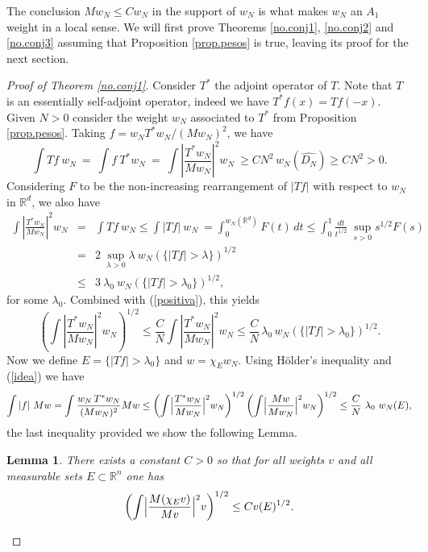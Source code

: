 \documentclass[11pt]{amsart}
\newtheorem{lemma}[teo]{Lemma}
\theoremstyle{definition}
\begin{document}
The conclusion $Mw_N\leq C w_N $ in the support of $ w_N$ is what makes  $ w_N$ an $A_1$ weight in a local sense. We will first prove Theorems \ref{no.conj1}, \ref{no.conj2} and \ref{no.conj3} assuming that Proposition \ref{prop.pesos} is true, leaving its proof for the next section.

\bigskip

\begin{proof}[Proof of Theorem \ref{no.conj1}] Consider $T^\ast$ the adjoint operator of $T$. Note that $T$ is an essentially self-adjoint operator, indeed we have $T^\ast f(x)= Tf(-x)$. Given $N>0$ consider the weight $w_N$ associated to $T^\ast$ from Proposition \ref{prop.pesos}. Taking $f=w_N T^\ast w_N/(Mw_N)^2$, we have
\begin{equation}\label{positiva}
\int Tf\ w_N\ =\ \int f\ T^\ast w_N\ =\ \int \left|\frac{T^\ast w_N}{Mw_N}\right|^2 w_N\ \geq CN^2\,w_N(\widehat{D_N})\geq CN^2> 0.
\end{equation}
Considering $F$ to be the non-increasing rearrangement of $|Tf|$ with respect to $w_N$ in ${\mathbb{R}}^d$, we also have
\begin{eqnarray}\label{lambda}
\int \left|\frac{T^\ast w_N}{Mw_N}\right|^2 w_N&=&\int Tf\ w_N \leq \int |Tf|\ w_N\ = \int_0^{w_N({\mathbb{R}}^d)} F(t)\,dt \leq \int_0^1 \frac{dt}{t^{1/2}}\  \sup_{s>0} s^{1/2} F(s) \nonumber\\&=& 2\ \sup_{\lambda>0} \lambda\ w_N(\{|Tf|>\lambda\})^{1/2} \nonumber\\&\leq& 3\ \lambda_0\ w_N(\{|Tf|>\lambda_0\})^{1/2},
\end{eqnarray}
for some $\lambda_0$. Combined with (\ref{positiva}), this yields 
\begin{equation}\label{idea}
\left(\int \left|\frac{T^\ast w_N}{Mw_N}\right|^2 w_N\right)^{1/2}\leq \frac CN \int \left|\frac{T^\ast w_N}{Mw_N}\right|^2 w_N \leq \frac CN\,\lambda_0\, w_N(\{|Tf|>\lambda_0\})^{1/2}.
\end{equation} 
Now we define $E=\{|Tf|>\lambda_0\}$ and $w=\chi_Ew_N$. Using H\"older's inequality and (\ref{idea}) we have
\[
\int |f|\ Mw = \int \frac{w_N\,T^\ast w_N}{(Mw_N)^2} Mw \leq \left(\int \Bigl|\frac{T^\ast w_N}{Mw_N}\Bigl|^2w_N\right)^{1/2}\left(\int \Bigl|\frac{Mw}{Mw_N}\Bigr|^2w_N\right)^{1/2} \leq \frac CN\ \lambda_0\ w_N(E),
\]
the last inequality provided we show the following Lemma.

\bigskip

\begin{lemma}
There exists a constant $C>0$ so that for all weights $v$ and all measurable sets $E\subset {\mathbb{R}}^n$ one has
\begin{equation}\label{desigualdad}
\left(\int \Bigl|\frac{M(\chi_Ev)}{Mv}\Bigr|^2 v\right)^{1/2} \leq C v(E)^{1/2}.
\end{equation}
\end{lemma}


\end{proof}
\end{document}
